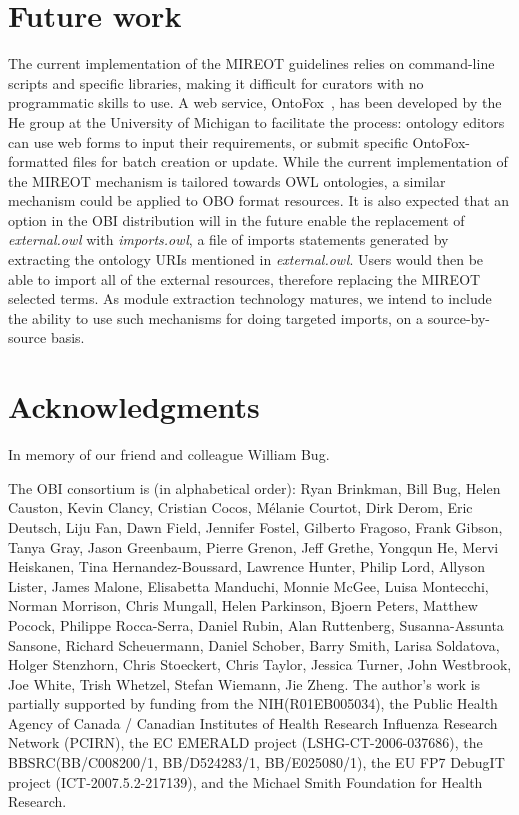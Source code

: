 \documentclass[jou]{ao2e}%
\begin{document}
\section{Future work}
The current implementation of the \ac{MIREOT} guidelines relies on command-line scripts and specific libraries, making it difficult for curators with no programmatic skills to use. 
A web service, OntoFox~\citep{OntoFox}, has been developed by the He group at the University of Michigan to facilitate the process: ontology editors can use web forms to input their requirements, or submit specific OntoFox-formatted files for batch creation or update.
While the current implementation of the MIREOT mechanism is tailored towards OWL ontologies, a similar mechanism could be applied to OBO format resources.
It is also expected that an option in the \ac{OBI} distribution will in the future enable the replacement of \emph{external.owl} with \emph{imports.owl}, a file of imports statements generated by extracting the ontology URIs mentioned in \emph{external.owl}. Users would then be able to import all of the external resources, therefore replacing the MIREOT selected terms.  As module extraction technology matures, we intend to include the ability to use such mechanisms for doing targeted imports, on a source-by-source basis.%

\section*{Acknowledgments}

In memory of our friend and colleague William Bug. 

The OBI consortium is (in alphabetical order): Ryan Brinkman, Bill Bug, Helen Causton, Kevin Clancy, Cristian Cocos, M\'elanie Courtot, Dirk Derom, Eric Deutsch, Liju Fan, Dawn Field, Jennifer Fostel, Gilberto Fragoso, Frank Gibson, Tanya Gray, Jason Greenbaum, Pierre Grenon, Jeff Grethe, Yongqun He, Mervi Heiskanen, Tina Hernandez-Boussard, Lawrence Hunter, Philip Lord, Allyson Lister, James Malone, Elisabetta Manduchi, Monnie McGee, Luisa Montecchi, Norman Morrison, Chris Mungall, Helen Parkinson, Bjoern Peters, Matthew Pocock, Philippe Rocca-Serra, Daniel Rubin, Alan Ruttenberg, Susanna-Assunta Sansone, Richard Scheuermann, Daniel Schober, Barry Smith, Larisa Soldatova, Holger Stenzhorn, Chris Stoeckert, Chris Taylor, Jessica Turner, John Westbrook,  Joe White, Trish Whetzel, Stefan Wiemann, Jie Zheng. 
The author's work is partially supported by funding from the NIH(R01EB005034),  the Public Health Agency of Canada / Canadian Institutes of Health Research Influenza Research Network (PCIRN), the EC EMERALD project (LSHG-CT-2006-037686), the BBSRC(BB/C008200/1, BB/D524283/1, BB/E025080/1), the EU FP7 DebugIT project (ICT-2007.5.2-217139), and the Michael Smith Foundation for Health Research.
\end{document}
